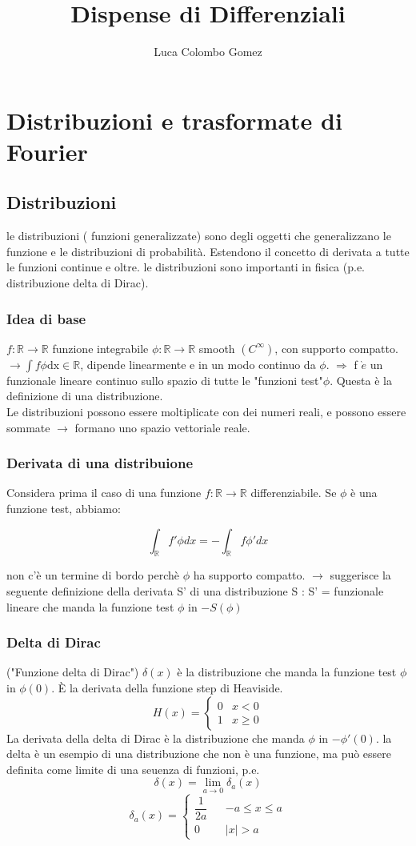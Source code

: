 \documentclass[a4paper,11pt]{report}
\title{Dispense di Differenziali}
\author{Luca Colombo Gomez}
\date{}
\newcommand{\R}{\mathbb{R}}
\begin{document}
\tableofcontents
\chapter{Distribuzioni e trasformate di Fourier}
\section{Distribuzioni}
le distribuzioni ( funzioni generalizzate) sono degli oggetti che generalizzano le funzione e le distribuzioni di probabilità. 
Estendono il concetto di derivata a tutte le funzioni continue e oltre.
le distribuzioni sono importanti in fisica (p.e. distribuzione delta di Dirac).

\subsection{Idea di base}
$f:\R\rightarrow\R $ funzione integrabile
$ \phi : \R \rightarrow \R $ smooth $\left(C^{\infty}\right)$, con supporto compatto.
$\rightarrow \int f \phi \mathrm{dx} \in \mathbb{R}$, dipende linearmente e in un modo continuo da $\phi$.
$\Rightarrow$ f $\grave{e}$ un funzionale lineare continuo sullo spazio di tutte le "funzioni test"$\phi.$ Questa è la definizione di una distribuzione.\\
Le distribuzioni possono essere moltiplicate con dei numeri reali, e possono essere sommate $\rightarrow$ formano uno spazio vettoriale reale.
\subsection{Derivata di una distribuione}
Considera prima il caso di una funzione $f:\R \rightarrow \R$ differenziabile. Se $\phi$ è una funzione test, abbiamo:

$$\int_{\R}f'\phi dx = -\int_{\R}f\phi ' dx$$

non c'è un termine di bordo perchè $\phi $ ha supporto compatto. $\rightarrow $ suggerisce la seguente definizione della derivata S' di una distribuzione 
S : S' = funzionale lineare che manda la funzione test $\phi$ in $-S\left(\phi\right)$

\subsection{Delta di Dirac}
("Funzione delta di Dirac") $\delta(x)$ è la distribuzione che manda la funzione test $\phi$ in $\phi(0)$. È la derivata della funzione step di Heaviside.
$$
H\left(x\right)=\left\{ \begin{matrix}
0 & x < 0 \\
1 & x \geq 0
\end{matrix}\right. $$
La derivata della delta di Dirac è la distribuzione che manda $\phi$ in $-\phi '(0)$. la delta è un esempio di una distribuzione che non è una funzione, ma può essere definita come limite di una seuenza di funzioni, p.e.
$$ \delta\left(x\right) = \lim_{a\to 0}\delta_a\left(x\right) $$
$$ \delta_a\left(x\right) = \left\{\begin{matrix}
\dfrac{1}{2a} && -a\leq x\leq a\\
0 && |x| > a
\end{matrix}\right.$$
\end{document}

